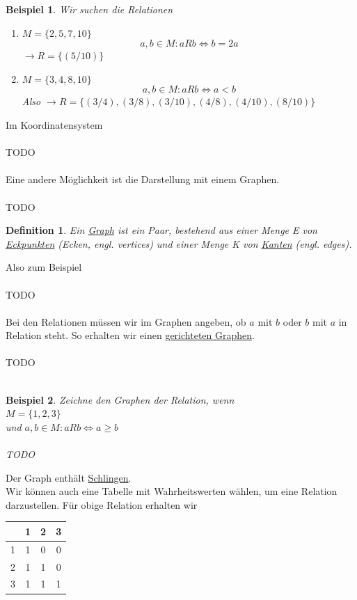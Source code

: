 \documentclass{report}
\newtheorem{mydef}{Definition}
\newtheorem{myexample}{Beispiel}
\begin{document}
\begin{myexample}Wir suchen die Relationen\begin{enumerate}
\item $M = \{2, 5, 7, 10\}$\\
\begin{equation}a,b \in M : a R b \iff b = 2a\end{equation}
$\to R = \{(5/10)\}$
\item $M = \{3,4,8,10\}$\\
\begin{equation}a,b \in M : a R b \iff a < b\end{equation}
Also
$\to R = \{(3/4),(3/8),(3/10),(4/8),(4/10),(8/10)\}$\end{enumerate}\end{myexample}
Im Koordinatensystem
\\\\TODO\\\\
Eine andere Möglichkeit ist die Darstellung mit einem Graphen.
\\\\TODO
\begin{mydef}Ein \underline{Graph} ist ein Paar, bestehend aus einer Menge E von \underline{Eckpunkten} (Ecken, engl. vertices) und einer Menge K von \underline{Kanten} (engl. edges).\end{mydef}
Also zum Beispiel
\\\\TODO\\\\ %
Bei den Relationen müssen wir im Graphen angeben, ob $a$ mit $b$ oder $b$ mit $a$ in Relation steht. So erhalten wir einen \underline{gerichteten Graphen}.
\\\\TODO\\\\
\begin{myexample}Zeichne den Graphen der Relation, wenn\\
$M = \{1, 2, 3\}$\\
und $a,b \in M: a R b \iff a \geq b$
\\\\TODO\end{myexample}
Der Graph enthält \underline{Schlingen}.\\
Wir können auch eine Tabelle mit Wahrheitswerten wählen, um eine Relation darzustellen. Für obige Relation erhalten wir
\begin{center}\begin{tabular}{c | c | c | c |}
& 1 & 2 & 3\\ \hline
1 & 1 & 0 & 0\\ \hline
2 & 1 & 1 & 0\\ \hline
3 & 1 & 1 & 1\\ \hline\end{tabular}\end{center}
\end{document}

